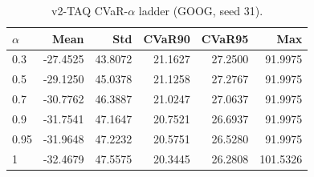 \begin{table}[H]
    \centering
    \caption{v2-TAQ CVaR-$\alpha$ ladder (GOOG, seed 31).}
    \label{tab:v2_taq_alpha}
    \begin{tabular}{@{}lrrrrr@{}}
        \toprule
        $\alpha$ & Mean & Std & CVaR90 & CVaR95 & Max \\
        \midrule
        0.3 & -27.4525 & 43.8072 & 21.1627 & 27.2500 & 91.9975 \\
        0.5 & -29.1250 & 45.0378 & 21.1258 & 27.2767 & 91.9975 \\
        0.7 & -30.7762 & 46.3887 & 21.0247 & 27.0637 & 91.9975 \\
        0.9 & -31.7541 & 47.1647 & 20.7521 & 26.6937 & 91.9975 \\
        0.95 & -31.9648 & 47.2232 & 20.5751 & 26.5280 & 91.9975 \\
        1 & -32.4679 & 47.5575 & 20.3445 & 26.2808 & 101.5326 \\
        \bottomrule
    \end{tabular}
\end{table}
